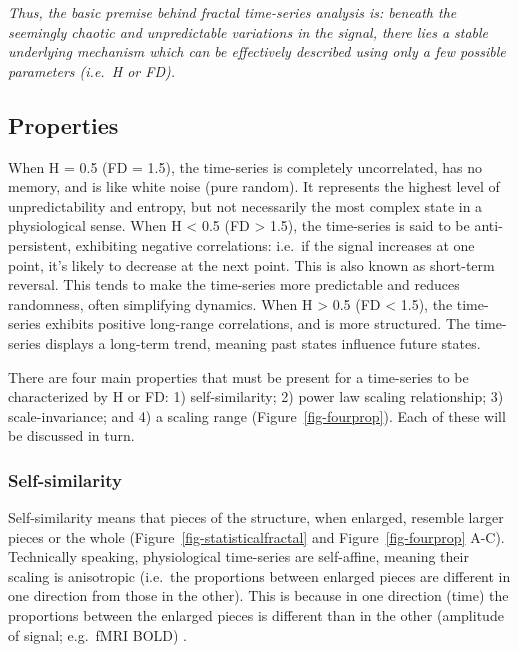 \documentclass[
  sn-vancouver,
  Numbered,
  referee,
  lineno]{sn-jnl}
\begin{document}
\emph{Thus, the basic premise behind fractal time-series analysis is:
beneath the seemingly chaotic and unpredictable variations in the
signal, there lies a stable underlying mechanism which can be
effectively described using only a few possible parameters (i.e.~H or
FD).}

\subsection{Properties}\label{sec-properties}

When H = 0.5 (FD = 1.5), the time-series is completely uncorrelated, has
no memory, and is like white noise (pure random). It represents the
highest level of unpredictability and entropy, but not necessarily the
most complex state in a physiological sense. When H \textless{} 0.5 (FD
\textgreater{} 1.5), the time-series is said to be anti-persistent,
exhibiting negative correlations: i.e.~if the signal increases at one
point, it's likely to decrease at the next point. This is also known as
short-term reversal. This tends to make the time-series more predictable
and reduces randomness, often simplifying dynamics. When H
\textgreater{} 0.5 (FD \textless{} 1.5), the time-series exhibits
positive long-range correlations, and is more structured. The
time-series displays a long-term trend, meaning past states influence
future states.

There are four main properties that must be present for a time-series to
be characterized by H or FD: 1) self-similarity; 2) power law scaling
relationship; 3) scale-invariance; and 4) a scaling range
(Figure~\ref{fig-fourprop}). Each of these will be discussed in turn.

\subsubsection{Self-similarity}\label{self-similarity}

Self-similarity means that pieces of the structure, when enlarged,
resemble larger pieces or the whole (Figure~\ref{fig-statisticalfractal}
and Figure~\ref{fig-fourprop} A-C). Technically speaking, physiological
time-series are self-affine, meaning their scaling is anisotropic
(i.e.~the proportions between enlarged pieces are different in one
direction from those in the other). This is because in one direction
(time) the proportions between the enlarged pieces is different than in
the other (amplitude of signal; e.g.~fMRI BOLD)
\citep{ekePhysiologicalTimeSeries2000}.
\end{document}
